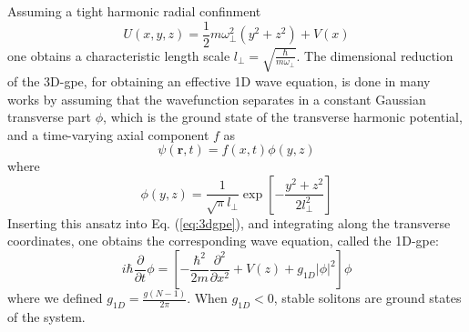 \documentclass[pra,twocolumn]{revtex4-2}
\begin{document}
  Assuming a tight harmonic radial confinment
  \begin{equation}
      U(x, y, z) = \frac{1}{2}m\omega_\perp^2 (y^2+z^2) + V(x)
  \end{equation}
  one obtains a characteristic length scale $l_\perp = \sqrt{\frac{\hbar}{m\omega_\perp}}$.
  The dimensional reduction of the 3D-\gls{gpe}, for obtaining an effective 1D wave equation, is done in many works by assuming that the wavefunction separates in a constant Gaussian transverse part $\phi$, which is the ground state of the transverse harmonic potential, and a time-varying axial component $f$ as 
  \begin{equation}\label{eq:1dansats}
      \psi(\mathbf{r}, t) = f(x, t) \phi(y, z)
  \end{equation}
  where
  \begin{equation}
      \phi(y, z) = \dfrac{1}{\sqrt{\pi} l_\perp} \exp\left[-\frac{y^2+z^2}{2l_\perp^2}\right]
  \end{equation}
  Inserting this ansatz into Eq. (\ref{eq:3dgpe}), and integrating along the transverse coordinates, one obtains the corresponding wave equation, called the 1D-\gls{gpe}:
  \begin{equation}\label{eq:gpe}
    i\hbar \dfrac{\partial}{\partial t}\phi = \left[-\dfrac{\hbar^2}{2m}\dfrac{\partial^2}{\partial x^2} + V(z) + g_{1D}|\phi|^2\right]\phi
  \end{equation}
  where we defined $g_{1D} = \frac{g (N-1)}{2\pi}$. When $g_{1D}<0$, stable solitons are ground states of the system.
\end{document}
